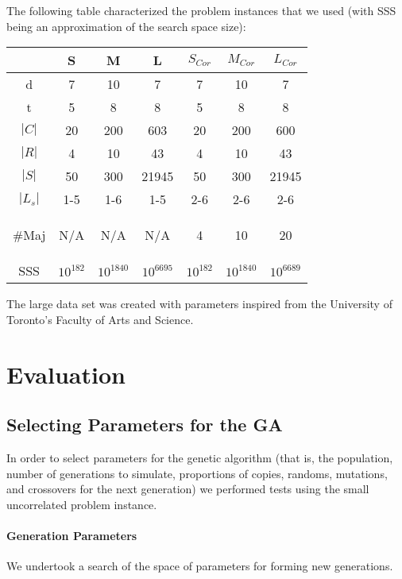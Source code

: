 \documentclass[letterpaper]{article}
\begin{document}
      The following table characterized the problem instances that we used 
      (with \textsc{SSS} being an approximation of the search space size):      
      \begin{center}
      \begin{small}
      \begin{tabular}{*{7}{c}}
      \hline 
      	& S 	& M 	& L 	& $S_{Cor}$ & $M_{Cor}$ & $L_{Cor}$ \\ 
      \hline \hline
       d 		& 7 	& 10	& 7 	& 7 	& 10 	& 7 	\\ 
       t 		& 5		& 8 	& 8 	& 5 	& 8 	& 8 	\\ 
       $|C|$	& 20 	& 200 	& 603 	& 20 	& 200 	& 600 	\\ 
       $|R|$	& 4 	& 10 	& 43 	& 4 	& 10 	& 43	\\ 
       $|S|$	& 50 	& 300 	& 21945 & 50 	& 300 	& 21945	\\ 
       $|L_s|$	& 1-5 	& 1-6 	& 1-5 	& 2-6 	& 2-6 	& 2-6 	\\ 
       \begin{tiny}$\#$Maj\end{tiny}	& N/A 	& N/A 	& N/A 	& 4 	& 10 	& 20 	\\ 
       \textsc{SSS}	& $10^{182}$ & $10^{1840}$ & $10^{6695}$ & $10^{182}$ & $10^{1840}$ & $10^{6689}$ \\
      \hline 
	  \end{tabular} 
	  \end{small}
	  \end{center}
	  
	  The large data set was created with parameters inspired from the University of 
	  Toronto's Faculty of Arts and Science.
	  
\section{Evaluation}
   \subsection{Selecting Parameters for the GA}
      In order to select parameters for the genetic algorithm (that is, the population, 
      number of generations to simulate, proportions of copies, randoms, mutations, and 
      crossovers for the next generation) we performed tests using the small uncorrelated 
      problem instance.
      
      \paragraph{Generation Parameters}
        We undertook a search of the space of parameters for forming new generations. 
\end{document}
